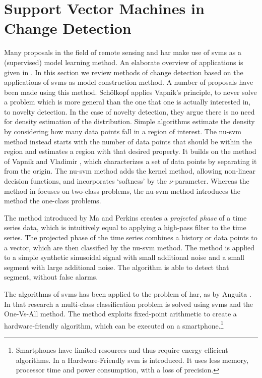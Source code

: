 \section{Support Vector Machines in Change Detection}\label{sec:literature_review_svm}

Many proposals in the field of remote sensing and \gls{har} make use of \glspl{svm} as a (supervised) model learning method.
An elaborate overview of applications is given in \cite{mountrakis2011support}.
In this section we review methods of change detection based on the applications of \glspl{svm} as model construction method.
A number of proposals have been made using this method.
Sch{\"o}lkopf \etal \cite{scholkopf1999support} applies Vapnik's principle, to never solve a problem which is more general than the one that one is actually interested in, to novelty detection.
In the case of novelty detection, they argue there is no need for density estimation of the distribution.
Simple algorithms estimate the density by considering how many data points fall in a region of interest.
The \gls{nu-svm} method instead starts with the number of data points that should be within the region and estimates a region with that desired property.
It builds on the method of Vapnik and Vladimir \cite{vapnik1963pattern}, which characterizes a set of data points by separating it from the origin.
The \gls{nu-svm} method adds the kernel method, allowing non-linear decision functions, and incorporates `softness' by the $\nu$-parameter.
Whereas the method in \cite{vapnik1963pattern} focuses on two-class problems, the \gls{nu-svm} method introduces the method the one-class problems.

The method introduced by Ma and Perkins \cite{ma2003time} creates a \emph{projected phase} of a time series data, which is intuitively equal to applying a high-pass filter to the time series.
The projected phase of the time series combines a history or data points to a vector, which are then classified by the \gls{nu-svm} method.
The method is applied to a simple synthetic sinusoidal signal with small additional noise and a small segment with large additional noise.
The algorithm is able to detect that segment, without false alarms.

The algorithms of \glspl{svm} has been applied to the problem of \gls{har}, as by Anguita \etal \cite{anguita2012human}.
In that research a multi-class classification problem is solved using \glspl{svm} and the One-Vs-All method.
The method exploits fixed-point arithmetic to create a hardware-friendly algorithm, which can be executed on a smartphone.\footnote{Smartphones have limited resources and thus require energy-efficient algorithms. In \cite{anguita2007hardware} a Hardware-Friendly \gls{svm} is introduced. It uses less memory, processor time and power consumption, with a loss of precision.}

